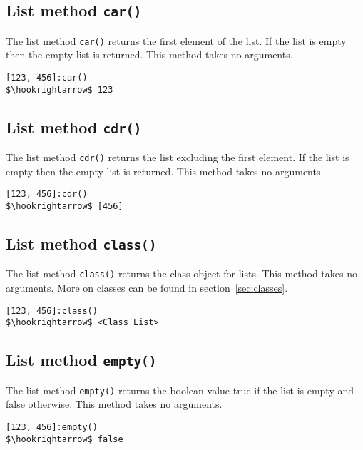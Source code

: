 \documentclass[11pt,a4paper]{scrbook}
\begin{document}
\subsection{List method \texttt{car()}}

The list method \texttt{car()} returns the first element of the list. If the
list is empty then the empty list is returned. This method takes no arguments.

\begin{lstlisting}[language=BibTool,mathescape=true]
[123, 456]:car()
$\hookrightarrow$ 123
\end{lstlisting}

\subsection{List method \texttt{cdr()}}

The list method \texttt{cdr()} returns the list excluding the first element.
If the list is empty then the empty list is returned. This method takes no
arguments.

\begin{lstlisting}[language=BibTool,mathescape=true]
[123, 456]:cdr()
$\hookrightarrow$ [456]
\end{lstlisting}

\subsection{List method \texttt{class()}}

The list method \texttt{class()} returns the class object for lists. This
method takes no arguments. More on classes can be found in
section~\ref{sec:classes}.

\begin{lstlisting}[language=BibTool,mathescape=true]
[123, 456]:class()
$\hookrightarrow$ <Class List>
\end{lstlisting}

\subsection{List method \texttt{empty()}}

The list method \texttt{empty()} returns the boolean value true if the list is
empty and false otherwise. This method takes no arguments.

\begin{lstlisting}[language=BibTool,mathescape=true]
[123, 456]:empty()
$\hookrightarrow$ false
\end{lstlisting}
\end{document}
